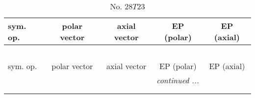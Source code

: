 \documentclass[fleqn,10pt,landscape]{jsarticle}
\begin{document}
\newpage
\begin{center}
\renewcommand{\arraystretch}{1.3}
\begin{longtable}{lcccc}
\caption{No. 28\quad$T$\quad$23$\quad[ cubic ]}
 \\
 \hline \hline
sym. op. & polar vector & axial vector & EP (polar) & EP (axial) \\ \hline \endfirsthead

\multicolumn{4}{l}{\tablename\ \thetable{}} \\
 \hline \hline
sym. op. & polar vector & axial vector & EP (polar) & EP (axial) \\ \hline \endhead

 \hline \hline
\multicolumn{4}{r}{\footnotesize\it continued ...} \\ \endfoot

 \hline \hline
\multicolumn{4}{r}{} \\ \endlastfoot


\end{longtable}
\end{center}
\end{document}
